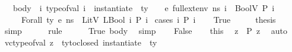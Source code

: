 \begin{isabellebody}
\ \ \ body{\isacharcolon}{\kern0pt}\ {\isachardoublequoteopen}{\isasymAnd}\ i{\isachardot}{\kern0pt}\ type{\isacharunderscore}{\kern0pt}of{\isacharunderscore}{\kern0pt}val\ i\ {\isacharequal}{\kern0pt}\ instantiate\ {\isasymOmega}\ ty\ {\isasymLongrightarrow}\ {\isasymLambda}{\isacharcomma}{\kern0pt}{\isasymGamma}{\isacharcomma}{\kern0pt}{\isasymOmega}\ {\isasymturnstile}\ {\isasymlangle}e{\isacharcomma}{\kern0pt}\ full{\isacharunderscore}{\kern0pt}ext{\isacharunderscore}{\kern0pt}env\ ns\ i{\isasymrangle}\ {\isasymDown}\ BoolV\ {\isacharparenleft}{\kern0pt}P\ i{\isacharparenright}{\kern0pt}{\isachardoublequoteclose}\isanewline
\ \ \ {\isachardoublequoteopen}{\isasymLambda}{\isacharcomma}{\kern0pt}{\isasymGamma}{\isacharcomma}{\kern0pt}{\isasymOmega}\ {\isasymturnstile}\ {\isasymlangle}Forall\ ty\ e{\isacharcomma}{\kern0pt}\ ns{\isasymrangle}\ {\isasymDown}\ LitV\ {\isacharparenleft}{\kern0pt}LBool\ {\isacharparenleft}{\kern0pt}{\isasymforall}i{\isachardot}{\kern0pt}\ P\ i{\isacharparenright}{\kern0pt}{\isacharparenright}{\kern0pt}{\isachardoublequoteclose}\isanewline
%
\isadelimproof
%
\endisadelimproof
%
\isatagproof
{}\isamarkupfalse%
\ {\isacharparenleft}{\kern0pt}cases\ {\isachardoublequoteopen}{\isasymforall}i{\isachardot}{\kern0pt}\ P\ i{\isachardoublequoteclose}{\isacharparenright}{\kern0pt}\isanewline
\ \ \isamarkupfalse%
\ True\isanewline
\ \ \isamarkupfalse%
\ \isamarkupfalse%
\ {\isacharquery}{\kern0pt}thesis\isanewline
\ \ \ \ \isamarkupfalse%
\ simp\isanewline
\ \ \ \ \isamarkupfalse%
\ rule\isanewline
\ \ \ \ \isamarkupfalse%
\ True\ body\ \isamarkupfalse%
\ simp\isanewline
{}\isamarkupfalse%
\isanewline
\ \ \isamarkupfalse%
\ False\isanewline
\ \ \isamarkupfalse%
\ this\ \isamarkupfalse%
\ z\ \ {\isachardoublequoteopen}{\isasymnot}{\isacharparenleft}{\kern0pt}P\ z{\isacharparenright}{\kern0pt}{\isachardoublequoteclose}\ \isamarkupfalse%
\ auto\isanewline
\ \ \isamarkupfalse%
\ {\isachardoublequoteopen}vc{\isacharunderscore}{\kern0pt}type{\isacharunderscore}{\kern0pt}of{\isacharunderscore}{\kern0pt}val\ z\ {\isacharequal}{\kern0pt}\ ty{\isacharunderscore}{\kern0pt}to{\isacharunderscore}{\kern0pt}closed\ {\isacharparenleft}{\kern0pt}instantiate\ {\isasymOmega}\ ty{\isacharparenright}{\kern0pt}{\isachardoublequoteclose}\ \isamarkupfalse%

\end{isabellebody}
